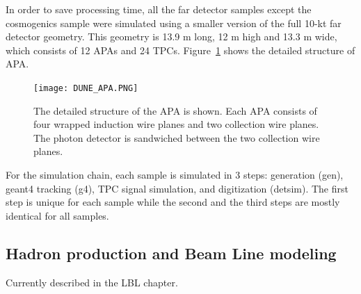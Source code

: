 In order to save processing time, all the far detector samples except the cosmogenics sample were simulated using a smaller version of the full 10-kt far detector geometry. This geometry is 13.9 m long, 12 m high and 13.3 m wide, which consists of 12 APAs and 24 TPCs. %
Figure~\ref{fig:dune_apa} shows the detailed structure of APA. %

\begin{figure}[!ht]
\centering
\texttt{[image: DUNE\_APA.PNG]}
\caption{The detailed structure of the APA is shown. Each APA consists of four wrapped induction wire planes and two collection wire planes.
The photon detector is sandwiched between the two collection wire planes.}
\label{fig:dune_apa}
\end{figure}

For the simulation chain, each sample is simulated in 3 steps: generation (gen), {\sc geant4} tracking (g4), TPC signal simulation, and digitization (detsim). The first step is unique for each sample while the second and the third steps are mostly identical for all samples. 

\subsection{Hadron production and Beam Line modeling}
\label{sec:tools-mc-had-beam}

Currently described in the LBL chapter.



